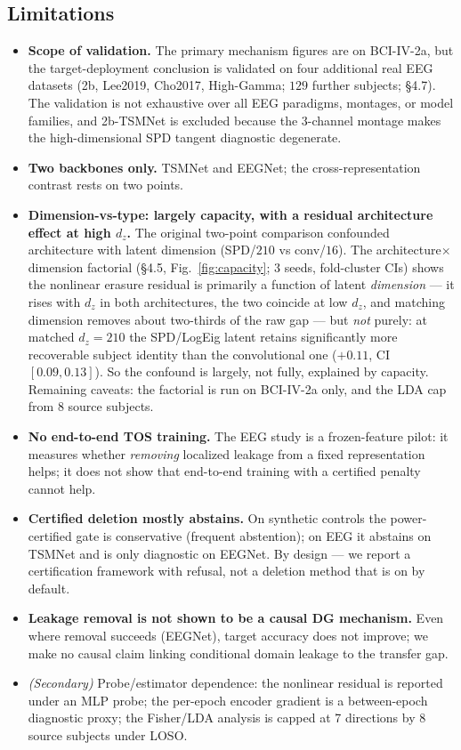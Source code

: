\subsection{Limitations}
\begin{itemize}
\item \textbf{Scope of validation.} The primary mechanism figures are on BCI-IV-2a, but the target-deployment
  conclusion is validated on four additional real EEG datasets (2b, Lee2019, Cho2017, High-Gamma; $129$ further
  subjects; \S4.7). The validation is not exhaustive over all EEG paradigms, montages, or model families, and
  2b-TSMNet is excluded because the $3$-channel montage makes the high-dimensional SPD tangent diagnostic degenerate.
\item \textbf{Two backbones only.} TSMNet and EEGNet; the cross-representation contrast rests on two points.
\item \textbf{Dimension-vs-type: largely capacity, with a residual architecture effect at high $d_z$.} The original
  two-point comparison confounded architecture with latent dimension (SPD/$210$ vs conv/$16$). The
  architecture$\times$dimension factorial (\S4.5, Fig.~\ref{fig:capacity}; 3 seeds, fold-cluster CIs) shows the
  nonlinear erasure residual is primarily a function of latent \emph{dimension} --- it rises with $d_z$ in both
  architectures, the two coincide at low $d_z$, and matching dimension removes about two-thirds of the raw gap ---
  but \emph{not} purely: at matched $d_z{=}210$ the SPD/LogEig latent retains significantly more recoverable
  subject identity than the convolutional one ($+0.11$, CI $[0.09,0.13]$). So the confound is largely, not fully,
  explained by capacity. Remaining caveats: the factorial is run on BCI-IV-2a only, and the LDA cap from $8$ source subjects.
\item \textbf{No end-to-end TOS training.} The EEG study is a frozen-feature pilot: it measures whether \emph{removing}
  localized leakage from a fixed representation helps; it does not show that end-to-end training with a
  certified penalty cannot help.
\item \textbf{Certified deletion mostly abstains.} On synthetic controls the power-certified gate is conservative
  (frequent abstention); on EEG it abstains on TSMNet and is only diagnostic on EEGNet. By design --- we
  report a certification framework with refusal, not a deletion method that is on by default.
\item \textbf{Leakage removal is not shown to be a causal DG mechanism.} Even where removal succeeds (EEGNet), target
  accuracy does not improve; we make no causal claim linking conditional domain leakage to the transfer gap.
\item \emph{(Secondary)} Probe/estimator dependence: the nonlinear residual is reported under an MLP probe; the
  per-epoch encoder gradient is a between-epoch diagnostic proxy; the Fisher/LDA analysis is capped at 7
  directions by 8 source subjects under LOSO.
\end{itemize}


